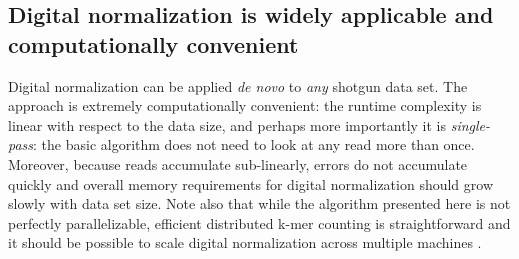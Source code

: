 \documentclass[10pt]{article}
\begin{document}

\subsection*{Digital normalization is widely applicable and computationally convenient}
%
Digital normalization can be applied {\em de novo} to {\em any}
shotgun data set.  The approach is extremely computationally
convenient: the runtime complexity is linear with respect to the data
size, and perhaps more importantly it is {\em single-pass}: the basic
algorithm does not need to look at any read more than once.  Moreover,
because reads accumulate sub-linearly, errors do not accumulate
quickly and overall memory requirements for digital normalization
should grow slowly with data set size.  Note also that while the
algorithm presented here is not perfectly parallelizable, efficient
distributed k-mer counting is straightforward and it should be
possible to scale digital normalization across multiple machines
\cite{pubmed19357099}.
\end{document}
